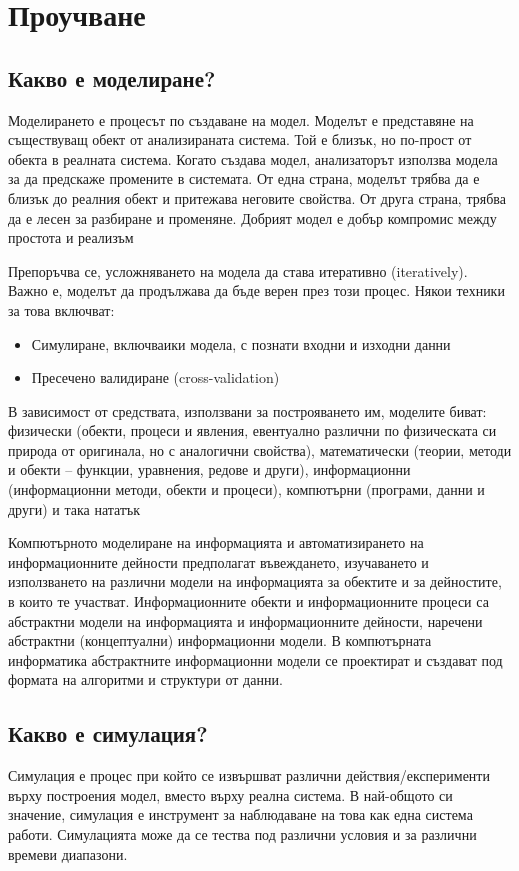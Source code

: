 \section{Проучване}
	\subsection{Какво е моделиране?}
	
		Моделирането е процесът по създаване на модел. Моделът е представяне на съществуващ обект 
		от анализираната система. Той е близък, но по-прост от обекта в реалната система.
		Когато създава модел, анализаторът използва модела за да предскаже промените в системата.
		От една страна, моделът трябва да е близък до реалния обект и притежава неговите свойства.
		От друга страна, трябва да е лесен за разбиране и променяне.
		Добрият модел е добър компромис между простота и реализъм \cite{Anu}
	
		Препоръчва се, усложняването на модела да става итеративно (iteratively). 
		Важно е, моделът да продължава да бъде верен през този процес. 
		Някои техники за това включват:
		\begin{itemize}
			\item Симулиране, включваики модела, с познати входни и изходни данни
			\item Пресечено валидиране (cross-validation) \cite{Mahoney}	
		\end{itemize}		 
		
		В зависимост от средствата, използвани за построяването им, моделите биват: физически
		(обекти, процеси и явления, евентуално различни по физическата си природа от оригинала,
		но с аналогични свойства), математически (теории, методи и обекти – функции, уравнения,
		редове и други), информационни (информационни методи, обекти и процеси), компютърни
		(програми, данни и други) и така нататък \cite{Totkov}
		
		Компютърното моделиране на информацията и автоматизирането на
		информационните дейности предполагат въвеждането, изучаването и използването на
		различни модели на информацията за обектите и за дейностите, в които те участват.
		Информационните обекти и информационните процеси са абстрактни модели на
		информацията и информационните дейности, наречени абстрактни (концептуални)
		информационни модели. В компютърната информатика абстрактните информационни
		модели се проектират и създават под формата на алгоритми и структури от данни. \cite{Totkov}
		
	\subsection{Какво е симулация?}
		Симулация е процес при който се извършват различни действия/експерименти върху построения модел, 
		вместо върху реална система. В най-общото си значение, симулация е инструмент за наблюдаване на това
		как една система работи. Симулацията може да се тества под различни условия и за различни времеви диапазони.
		
